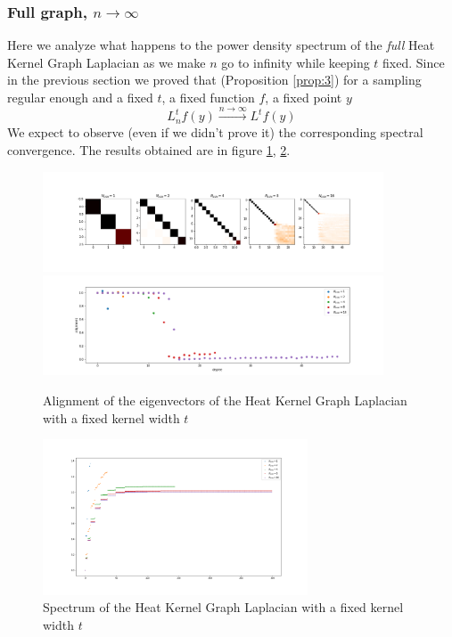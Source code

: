 \subsubsection{Full graph, $n\to\infty$}\label{sec:Chapter1: n to infty}
Here we analyze what happens to the power density spectrum of the \textit{full} Heat Kernel Graph Laplacian as we make $n$ go to infinity while keeping $t$ fixed. Since in the previous section we proved that (Proposition \ref{prop:3}) for a sampling regular enough and a fixed $t$, a fixed function $f$, a fixed point $y$
$$L_n^tf(y)\xrightarrow{n\to\infty}L^tf(y)$$
We expect to observe (even if we didn't prove it) the corresponding spectral convergence. The results obtained are in figure \ref{fig:n to infinity1}, \ref{fig:n to infinity3}.

\begin{figure}[h!]
	\centering
	\includegraphics[width=0.9\textwidth]{../codes/02.HeatKernelGraphLaplacian/HEALPix/06_figures/n.png}
	\includegraphics[width=0.9\textwidth]{../codes/02.HeatKernelGraphLaplacian/HEALPix/06_figures/n_diagonal.png}	
	\caption{\label{fig:n to infinity1}Alignment of the eigenvectors of the Heat Kernel Graph Laplacian with a fixed kernel width $t$}
	
\end{figure}
\begin{figure}[h!]

	\centering
	\includegraphics[width=0.7\textwidth]{../codes/02.HeatKernelGraphLaplacian/HEALPix/06_figures/n_eigenvalues.png}	
	\caption{\label{fig:n to infinity3}Spectrum of the Heat Kernel Graph Laplacian with a fixed kernel width $t$}
\end{figure}

